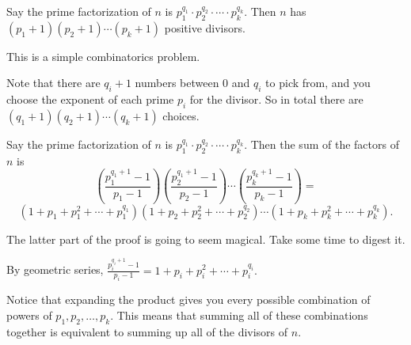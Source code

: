 \documentclass{article}
\begin{document}
\begin{theo}
Say the prime factorization of $n$ is $p_1^{q_1}\cdot p_2^{q_2}\cdot\cdots\cdot p_k^{q_k}.$ Then $n$ has $(p_1+1)(p_2+1)\cdots(p_k+1)$ positive divisors.
\end{theo}

\begin{pro}
This is a simple combinatorics problem.

Note that there are $q_i+1$ numbers between $0$ and $q_i$ to pick from, and you choose the exponent of each prime $p_i$ for the divisor. So in total there are $(q_1+1)(q_2+1)\cdots(q_k+1)$ choices.
\end{pro}

\begin{theo}
Say the prime factorization of $n$ is $p_1^{q_1}\cdot p_2^{q_2}\cdot\cdots\cdot p_k^{q_k}.$ Then the sum of the factors of $n$ is
\[\left(\frac{p_1^{q_1+1}-1}{p_1-1}\right)\left(\frac{p_2^{q_1+1}-1}{p_2-1}\right)\cdots\left(\frac{p_k^{q_k+1}-1}{p_k-1}\right)=\]
\[\left(1+p_1+p_1^2+\cdots+p_1^{q_1}\right)\left(1+p_2+p_2^2+\cdots+p_2^{q_2}\right)\cdots\left(1+p_k+p_k^2+\cdots+p_k^{q_k}\right).\]
\end{theo}
The latter part of the proof is going to seem magical. Take some time to digest it.

\begin{pro}
By geometric series, $\frac{p_i^{q_i+1}-1}{p_i-1}=1+p_i+p_i^2+\cdots+p_i^{q_i}.$

Notice that expanding the product gives you every possible combination of powers of $p_1,p_2,\ldots,p_k.$ This means that summing all of these combinations together is equivalent to summing up all of the divisors of $n.$
\end{pro}
\end{document}
